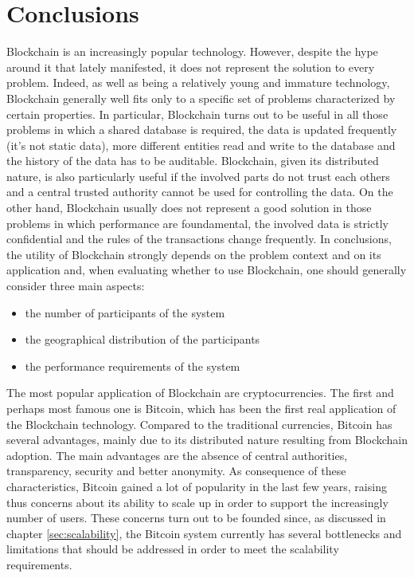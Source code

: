 \section{Conclusions}
Blockchain is an increasingly popular technology. However, despite the hype around it that lately manifested, it does not represent the solution to every problem. Indeed, as well as being a relatively young and immature technology, Blockchain generally well fits only to a specific set of problems characterized by certain properties. 
In particular, Blockchain turns out to be useful in all those problems in which a shared database is required, the data is updated frequently (it's not static data), more different entities read and write to the database and the history of the data has to be auditable. Blockchain, given its distributed nature, is also particularly useful if the involved parts do not trust each others and a central trusted authority cannot be used for controlling the data. On the other hand, Blockchain usually does not represent a good solution in those problems in which performance are foundamental, the involved data is strictly confidential and the rules of the transactions change frequently. In conclusions, the utility of Blockchain strongly depends on the problem context and on its application and, when evaluating whether to use Blockchain, one should generally consider three main aspects: 


\begin{itemize}
    \item the number of participants of the system
    \item the geographical distribution of the participants
    \item the performance requirements of the system
\end{itemize}

The most popular application of Blockchain are cryptocurrencies. The first and perhaps most famous one is Bitcoin, which has been the first real application of the Blockchain technology. Compared to the traditional currencies, Bitcoin has several advantages, mainly due to its distributed nature resulting from Blockchain adoption. The main advantages are the absence of central authorities, transparency, security and better anonymity. As consequence of these characteristics, Bitcoin gained a lot of popularity in the last few years, raising thus concerns about its ability to scale up in order to support the increasingly number of users. These concerns turn out to be founded since, as discussed in chapter \ref{sec:scalability}, the Bitcoin system currently has several bottlenecks and limitations that should be addressed in order to meet the scalability requirements.

